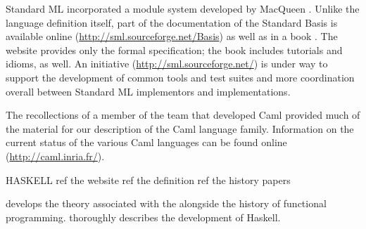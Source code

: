 Standard ML \citep{Milner:The-Definition:1990,Milner:Commentary:1990,Milner:The-Definition:1997} incorporated a module system developed by MacQueen \citep{MacQueen:Structure:1981,MacQueen:Modules:1984,MacQueen:Using:1986,MacQueen:A-semantics:1994}. Unlike the language definition itself, part of the documentation of the Standard Basis is available online (\url{http://sml.sourceforge.net/Basis}) as well as in a book \citep{Gansner:The-Standard:2002}. The website provides only the formal specification; the book includes tutorials and idioms, as well. An initiative (\url{http://sml.sourceforge.net/}) is under way to support the development of common tools and test suites and more coordination overall between Standard ML implementors and implementations.

The recollections of a member of the team that developed Caml \citep{Cousineau:A-brief:1996} provided much of the material for our description of the Caml language family. Information on the current status of the various Caml languages can be found online (\url{http://caml.inria.fr/}).

HASKELL
ref the website
ref the definition
ref the history papers

\citet{Hudak:Conception:1989} develops the theory associated with the \lambdacalc alongside the history of functional programming. \citet{Hudak:A-history:2007} thoroughly describes the development of Haskell.

%
